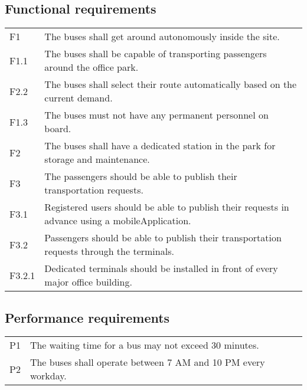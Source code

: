 \documentclass[a4paper]{article}
\begin{document}
\subsection{Functional requirements}
\begin{tabularx}{\textwidth}{p{.75cm} X}
	F1     & The buses shall get around \gls{autonomous}ly inside the
	         \gls{site}. \\

	F1.1   & The buses shall be capable of transporting passengers around
	         the office park. \\

	F2.2   & The buses shall select their \gls{route} \gls{automatically}
	         based on the current demand. \\

        F1.3   & The buses must not have any permanent personnel on board. \\

	F2     & The buses shall have a dedicated \gls{station} in the park for
	         storage and maintenance. \\

	F3     & The passengers should be able to publish their
	         \gls{transportation} \gls{request}s. \\

	F3.1   & Registered users should be able to publish their \gls{request}s
	         in advance using a \gls{mobileApplication}. \\

	F3.2   & Passengers should be able to publish their \gls{transportation}
	         \gls{request}s through the \gls{terminal}s. \\

	F3.2.1 & Dedicated \gls{terminal}s should be installed in front of every
	         major office building. \\
\end{tabularx}


\subsection{Performance requirements}
\begin{tabularx}{\textwidth}{p{.75cm} X}
        P1 & The waiting time for a bus may not exceed 30 minutes. \\
        P2 & The buses shall operate between 7 AM and 10 PM every workday. \\
\end{tabularx}
\end{document}
